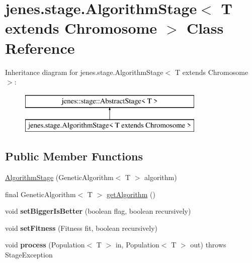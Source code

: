 \hypertarget{classjenes_1_1stage_1_1_algorithm_stage_3_01_t_01extends_01_chromosome_01_4}{\section{jenes.\-stage.\-Algorithm\-Stage$<$ T extends Chromosome $>$ Class Reference}
\label{classjenes_1_1stage_1_1_algorithm_stage_3_01_t_01extends_01_chromosome_01_4}
}
Inheritance diagram for jenes.\-stage.\-Algorithm\-Stage$<$ T extends Chromosome $>$\-:\begin{figure}[H]
\begin{center}
\leavevmode
\includegraphics[height=2.000000cm]{classjenes_1_1stage_1_1_algorithm_stage_3_01_t_01extends_01_chromosome_01_4}
\end{center}
\end{figure}
\subsection*{Public Member Functions}
\begin{DoxyCompactItemize}
\item 
\hyperlink{classjenes_1_1stage_1_1_algorithm_stage_3_01_t_01extends_01_chromosome_01_4_a802871d36189757fc869c5a542dc1b9c}{Algorithm\-Stage} (Genetic\-Algorithm$<$ T $>$ algorithm)
\item 
final Genetic\-Algorithm$<$ T $>$ \hyperlink{classjenes_1_1stage_1_1_algorithm_stage_3_01_t_01extends_01_chromosome_01_4_a7c1be30eb9852c0f16031f3802d770aa}{get\-Algorithm} ()
\item 
\hypertarget{classjenes_1_1stage_1_1_algorithm_stage_3_01_t_01extends_01_chromosome_01_4_a5d27c95b7872fc28cc7b78be601dd9d0}{void {\bfseries set\-Bigger\-Is\-Better} (boolean flag, boolean recursively)}\label{classjenes_1_1stage_1_1_algorithm_stage_3_01_t_01extends_01_chromosome_01_4_a5d27c95b7872fc28cc7b78be601dd9d0}

\item 
\hypertarget{classjenes_1_1stage_1_1_algorithm_stage_3_01_t_01extends_01_chromosome_01_4_a43c9964c60c539aaea0193c9552b262b}{void {\bfseries set\-Fitness} (Fitness fit, boolean recursively)}\label{classjenes_1_1stage_1_1_algorithm_stage_3_01_t_01extends_01_chromosome_01_4_a43c9964c60c539aaea0193c9552b262b}

\item 
\hypertarget{classjenes_1_1stage_1_1_algorithm_stage_3_01_t_01extends_01_chromosome_01_4_a43a7b7271f320f04c8be69bfdafb078e}{void {\bfseries process} (Population$<$ T $>$ in, Population$<$ T $>$ out)  throws Stage\-Exception }\label{classjenes_1_1stage_1_1_algorithm_stage_3_01_t_01extends_01_chromosome_01_4_a43a7b7271f320f04c8be69bfdafb078e}

\end{DoxyCompactItemize}



